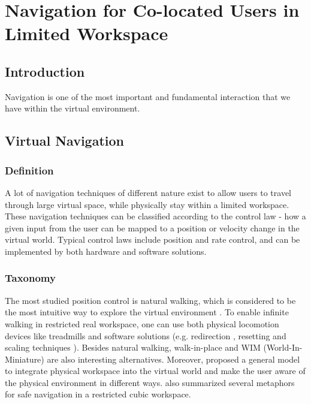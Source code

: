 \chapter{Navigation for Co-located Users in Limited Workspace}
\label{chapter:navigation}
\minitoc

\section{Introduction}
Navigation is one of the most important and fundamental interaction that we have within the virtual environment.

\section{Virtual Navigation}

\subsection{Definition}
A lot of navigation techniques of different nature exist to allow users to travel through large virtual space, while physically stay within a limited workspace. These navigation techniques can be classified according to the control law - how a given input from the user can be mapped to a position or velocity change in the virtual world. Typical control laws include position and rate control, and can be implemented by both hardware and software solutions.

\subsection{Taxonomy}
The most studied position control is natural walking, which is considered to be the most intuitive way to explore the virtual environment \citep{Ruddle2009BW}. To enable infinite walking in restricted real workspace, one can use both physical locomotion devices like treadmills \citep{Iwata1999Treadmill} and software solutions (e.g. redirection \citep{Peck2008RED}, resetting \citep{Williams2007ELV} and scaling techniques \cite{Interrante2007SLB}). Besides natural walking, walk-in-place \citep{Razzaque2002RWP} and WIM (World-In-Miniature) \citep{Stoakley1995VRW} are also interesting alternatives. Moreover, \citet{Fleury2010Generic} proposed a general model to integrate physical workspace into the virtual world and make the user aware of the physical environment in different ways. \citet{Cirio2012Cube} also summarized several metaphors for safe navigation in a restricted cubic workspace.

